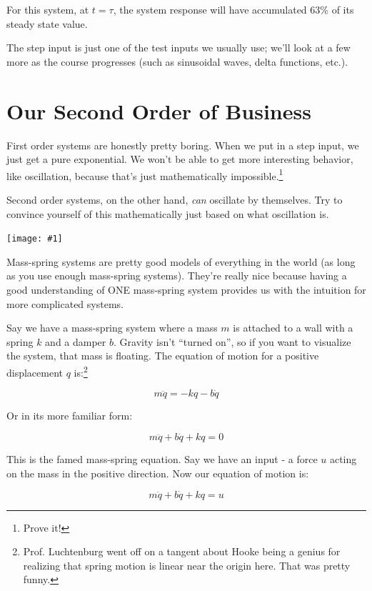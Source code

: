 \documentclass{article}
\newcommand{\bicture}[1]{
\begin{center}
    {\texttt{[image: \#1]}}
\end{center}}
\begin{document}
\begin{onehalfspacing}
\begin{flushleft}
For this system, at \(t=\tau\), the system response will have accumulated 63\% of its steady state value.

\medskip

The step input is just one of the test inputs we usually use; we'll look at a few more as the course progresses (such as sinusoidal waves, delta functions, etc.).

\section{Our Second Order of Business}

First order systems are honestly pretty boring. When we put in a step input, we just get a pure exponential. We won't be able to get more interesting behavior, like oscillation, because that's just mathematically impossible.\footnote{Prove it!}

\medskip

Second order systems, on the other hand, \textit{can} oscillate by themselves. Try to convince yourself of this mathematically just based on what oscillation is.

\bicture{2_unf}

Mass-spring systems are pretty good models of everything in the world (as long as you use enough mass-spring systems). They're really nice because having a good understanding of ONE mass-spring system provides us with the intuition for more complicated systems. 

\medskip

Say we have a mass-spring system where a mass \(m\) is attached to a wall with a spring \(k\) and a damper \(b\). Gravity isn't ``turned on'', so if you want to visualize the system, that mass is floating. The equation of motion for a positive displacement \(q\) is:\footnote{Prof. Luchtenburg went off on a tangent about Hooke being a genius for realizing that spring motion is linear near the origin here. That was pretty funny.}

\vspace{-0.1in}
\[m\ddot{q} = -kq - b\dot{q}\]

Or in its more familiar form:

\vspace{-0.1in}
\[m\ddot{q} + b\dot{q} + kq = 0\]

This is the famed mass-spring equation. Say we have an input - a force \(u\) acting on the mass in the positive direction. Now our equation of motion is:

\vspace{-0.1in}
\[m\ddot{q} + b\dot{q} + kq = u\]


\end{flushleft}
\end{onehalfspacing}
\end{document}
